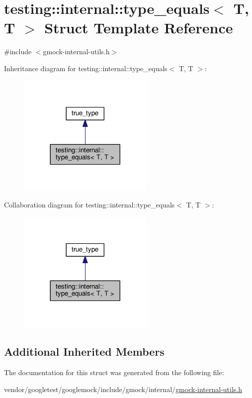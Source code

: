 \hypertarget{structtesting_1_1internal_1_1type__equals_3_01T_00_01T_01_4}{}\section{testing\+:\+:internal\+:\+:type\+\_\+equals$<$ T, T $>$ Struct Template Reference}
\label{structtesting_1_1internal_1_1type__equals_3_01T_00_01T_01_4}


{\ttfamily \#include $<$gmock-\/internal-\/utils.\+h$>$}



Inheritance diagram for testing\+:\+:internal\+:\+:type\+\_\+equals$<$ T, T $>$\+:
\nopagebreak
\begin{figure}[H]
\begin{center}
\leavevmode
\includegraphics[width=185pt]{structtesting_1_1internal_1_1type__equals_3_01T_00_01T_01_4__inherit__graph}
\end{center}
\end{figure}


Collaboration diagram for testing\+:\+:internal\+:\+:type\+\_\+equals$<$ T, T $>$\+:
\nopagebreak
\begin{figure}[H]
\begin{center}
\leavevmode
\includegraphics[width=185pt]{structtesting_1_1internal_1_1type__equals_3_01T_00_01T_01_4__coll__graph}
\end{center}
\end{figure}
\subsection*{Additional Inherited Members}


The documentation for this struct was generated from the following file\+:\begin{DoxyCompactItemize}
\item 
vendor/googletest/googlemock/include/gmock/internal/\hyperlink{gmock-internal-utils_8h}{gmock-\/internal-\/utils.\+h}\end{DoxyCompactItemize}
